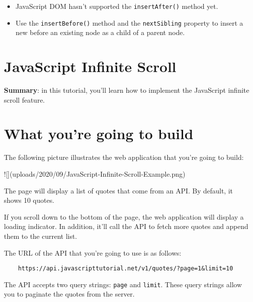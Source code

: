 \documentclass[11pt]{article}
\begin{document}
\begin{itemize}
\item JavaScript DOM hasn't supported the \verb|insertAfter()| method yet.
\item Use the \verb|insertBefore()| method and the \verb|nextSibling| property
to insert a new before an existing node as a child of a parent node.
\end{itemize}

\section*{\huge JavaScript Infinite Scroll}

\begin{displayquote}
\textbf{Summary}: in this tutorial, you'll learn how to implement the
JavaScript infinite scroll feature.
\end{displayquote}

\section*{What you're going to build}

The following picture illustrates the web application that
you're going to build:

![](uploads/2020/09/JavaScript-Infinite-Scroll-Example.png)

\noindent
The page will display a list of quotes that come from an API.
By default, it shows 10 quotes.
\newline

\noindent
If you scroll down to the bottom of the page, the web application will
display a loading indicator. In addition, it'll call the API to fetch
more quotes and append them to the current list.
\newline

\noindent
The URL of the API that you're going to use is as follows:

\begin{lstlisting}
    https://api.javascripttutorial.net/v1/quotes/?page=1&limit=10
\end{lstlisting}

\noindent
The API accepts two query strings: \verb|page| and \verb|limit|. These query
strings allow you to paginate the quotes from the server.
\newline
\end{document}
